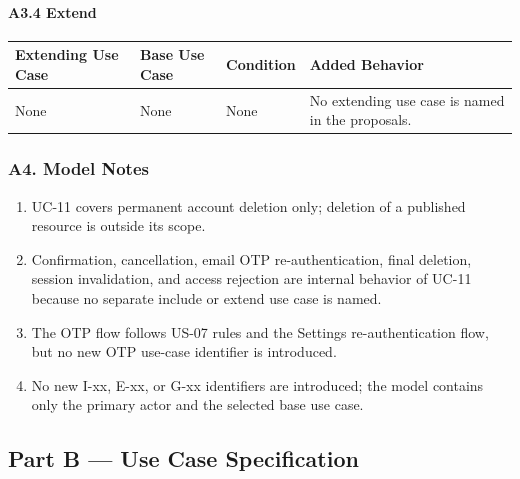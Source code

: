 \documentclass[12pt]{article}
\renewcommand{\baselinestretch}{1.5}
\begin{document}
\hypertarget{sec:a3-4-extend}{}
\paragraph*{A3.4 Extend}
\par\medskip

\begingroup
\small
\renewcommand{\baselinestretch}{1.0}\selectfont
\renewcommand{\arraystretch}{1.15}
\setlength{\tabcolsep}{6pt}
\begin{longtable}{|>{\raggedright\arraybackslash}p{}|>{\raggedright\arraybackslash}p{}|>{\raggedright\arraybackslash}p{}|>{\raggedright\arraybackslash}p{}|}
\hline
\textbf{Extending Use Case} & \textbf{Base Use Case} & \textbf{Condition} & \textbf{Added Behavior} \\ \hline
\endhead
None & None & None & No extending use case is named in the proposals. \\ \hline
\end{longtable}
\endgroup
\par\medskip

\hypertarget{sec:a4-model-notes}{}
\subsubsection*{A4. Model Notes}
\par\medskip

\begin{enumerate}
\item UC-11 covers permanent account deletion only; deletion of a published resource is outside its scope.
\item Confirmation, cancellation, email OTP re-authentication, final deletion, session invalidation, and access rejection are internal behavior of UC-11 because no separate include or extend use case is named.
\item The OTP flow follows US-07 rules and the Settings re-authentication flow, but no new OTP use-case identifier is introduced.
\item No new I-xx, E-xx, or G-xx identifiers are introduced; the model contains only the primary actor and the selected base use case.
\end{enumerate}
\par\medskip

\hypertarget{sec:part-b-use-case-specification}{}
\subsection*{Part B --- Use Case Specification}
\par\medskip
\end{document}

